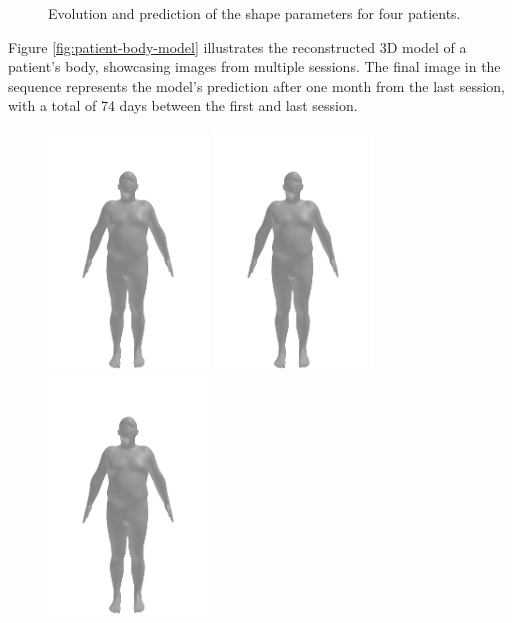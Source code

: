 \begin{figure}[h]
	\caption{Evolution and prediction of the shape parameters for four patients.}
	\label{fig:predicted-betas}
\end{figure}

Figure \ref{fig:patient-body-model} illustrates the reconstructed 3D model of a
patient's body, showcasing images from multiple sessions. The final image in
the sequence represents the model's prediction after one month from the last
session, with a total of 74 days between the first and last session.

\begin{figure}[h]
	\centering
	\includegraphics[width=120pt]{files/patients/2_6}
	\includegraphics[width=120pt]{files/patients/2_7}
	\includegraphics[width=120pt]{files/patients/2_8}

\end{figure}
